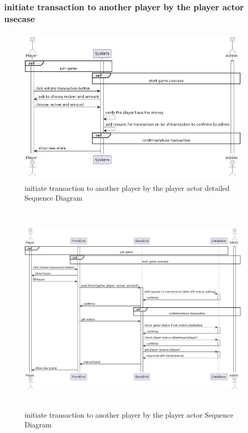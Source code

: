 \documentclass{article}
\begin{document}
\subsubsection{initiate transaction to another player by the player actor usecase}
\begin{figure}[H]
	\centering
	\includegraphics[height=3in]{../thesis_tex/assets/diagrams/player_initiate_transaction_to_another_player_SD.png}
	\caption{initiate transaction to another player by the player actor detailed Sequence Diagram}
\end{figure}

\begin{figure}[H]
	\centering
	\includegraphics[height=4in,width=6in]{../thesis_tex/assets/diagrams/player_initiate_transaction_to_another_player_detailedSD.png}
	\caption{initiate transaction to another player by the player actor Sequence Diagram}
\end{figure}
\end{document}

